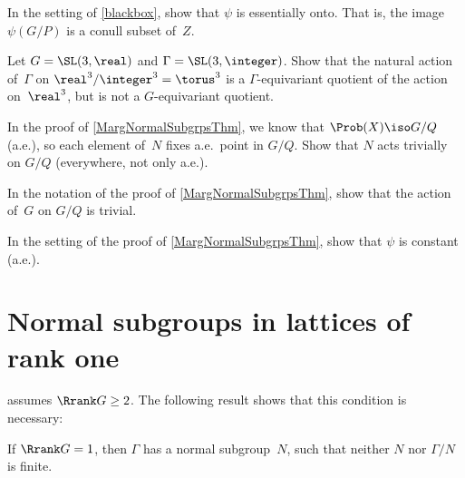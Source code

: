 \begin{exercises}
\item In the setting of \cref{blackbox}, show that $\psi$ is essentially onto. That is, the image $\psi(G/P)$ is a conull subset of~$Z$.

\item Let $G = \SL(3,\real)$ and $\Gamma = \SL(3,\integer)$.
Show that the natural action of~$\Gamma$ on $\real^3 / \integer^3 = \torus^3$ is a $\Gamma$-equivariant quotient of the action on~$\real^3$, but is not a $G$-equivariant quotient.

\item \label{NormalPf-NTrivEx}
In the proof of \cref{MargNormalSubgrpsThm}, we know that $\Prob(X) \iso G/Q$ (a.e.), so each element of~$N$ fixes a.e.\ point in $G/Q$. Show that $N$ acts trivially on $G/Q$ (everywhere, not only a.e.).

\item \label{NormalPf-GTrivEx}
In the notation of the proof of \cref{MargNormalSubgrpsThm}, show that the action of~$G$ on $G/Q$ is trivial.

\item  \label{AE1PtEx}
In the setting of the proof of \cref{MargNormalSubgrpsThm}, show that $\psi$ is constant (a.e.).
\end{exercises}






\section{Normal subgroups in lattices of rank one}

 assumes $\Rrank G \ge 2$. The following result shows that this condition is necessary:

\begin{thm} \label{Rrank1->GammaNotAlmSimple}
If\/ $\Rrank G = 1$, then\/ $\Gamma$ has a normal subgroup~$N$, such that neither $N$ nor\/ $\Gamma/N$ is finite.
\end{thm}

